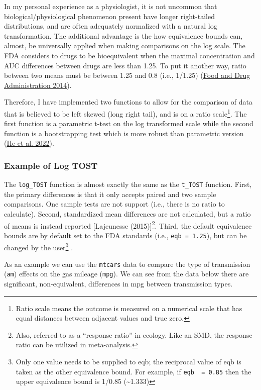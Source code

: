 \documentclass[
]{interact}
\begin{document}
In my personal experience as a physiologist, it is not uncommon that
biological/physiological phenomenon present have longer right-tailed
distributions, and are often adequately normalized with a natural log
transformation. The additional advantage is the how equivalence bounds
can, almost, be universally applied when making comparisons on the log
scale. The FDA considers to drugs to be bioequivalent when the maximal
concentration and AUC differences between drugs are less than 1.25. To
put it another way, ratio between two means must be between 1.25 and 0.8
(i.e., 1/1.25) (\protect\hyperlink{ref-fda}{Food and Drug Administration
2014}).

Therefore, I have implemented two functions to allow for the comparison
of data that is believed to be left skewed (long right tail), and is on
a ratio scale\footnote{Ratio scale means the outcome is measured on a
  numerical scale that has equal distances between adjacent values and
  true zero.}. The first function is a parametric t-test on the log
transformed scale while the second function is a bootstrapping test
which is more robust than parametric version
(\protect\hyperlink{ref-he2022}{He et al. 2022}).

\hypertarget{example-of-log-tost}{%
\subsubsection{Example of Log TOST}\label{example-of-log-tost}}

The \texttt{log\_TOST} function is almost exactly the same as the
\texttt{t\_TOST} function. First, the primary differences is that it
only accepts paired and two sample comparisons. One sample tests are not
support (i.e., there is no ratio to calculate). Second, standardized
mean differences are not calculated, but a ratio of means is instead
reported {[}Lajeunesse
(\protect\hyperlink{ref-lajeunesse2015bias}{2015}){]}\footnote{Also,
  referred to as a ``response ratio'' in ecology. Like an SMD, the
  response ratio can be utilized in meta-analysis.}. Third, the default
equivalence bounds are by default set to the FDA standards (i.e.,
\texttt{eqb\ =\ 1.25}), but can be changed by the user\footnote{Only one
  value needs to be supplied to eqb; the reciprocal value of eqb is
  taken as the other equivalence bound. For example, if
  \texttt{eqb\ \ =\ 0.85} then the upper equivalence bound is 1/0.85
  (\textasciitilde1.333)} .

As an example we can use the \texttt{mtcars} data to compare the type of
transmission (\texttt{am}) effects on the gas mileage (\texttt{mpg}). We
can see from the data below there are significant, non-equivalent,
differences in mpg between transmission types.
\end{document}
